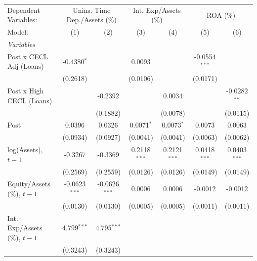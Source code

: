 
\begingroup
\centering
\begin{tabular}{lcccccc}
   \tabularnewline \midrule \midrule
   Dependent Variables: & \multicolumn{2}{c}{Unins. Time Dep./Assets (\%)} & \multicolumn{2}{c}{Int. Exp/Assets (\%)} & \multicolumn{2}{c}{ROA (\%)}\\
   Model:                         & (1)             & (2)             & (3)            & (4)            & (5)             & (6)\\  
   \midrule
   \emph{Variables}\\
   Post x CECL Adj (Loans)        & -0.4380$^{*}$   &                 & 0.0093         &                & -0.0554$^{***}$ &   \\   
                                  & (0.2618)        &                 & (0.0106)       &                & (0.0171)        &   \\   
   Post x High CECL (Loans)       &                 & -0.2392         &                & 0.0034         &                 & -0.0282$^{**}$\\   
                                  &                 & (0.1882)        &                & (0.0078)       &                 & (0.0115)\\   
   Post                           & 0.0396          & 0.0326          & 0.0071$^{*}$   & 0.0073$^{*}$   & 0.0073          & 0.0063\\   
                                  & (0.0934)        & (0.0927)        & (0.0041)       & (0.0041)       & (0.0063)        & (0.0062)\\   
   log(Assets), $t{-}1$           & -0.3267         & -0.3369         & 0.2118$^{***}$ & 0.2121$^{***}$ & 0.0418$^{***}$  & 0.0403$^{***}$\\   
                                  & (0.2569)        & (0.2559)        & (0.0126)       & (0.0126)       & (0.0149)        & (0.0149)\\   
   Equity/Assets (\%), $t{-}1$    & -0.0623$^{***}$ & -0.0626$^{***}$ & 0.0006         & 0.0006         & -0.0012         & -0.0012\\   
                                  & (0.0130)        & (0.0130)        & (0.0005)       & (0.0005)       & (0.0011)        & (0.0011)\\   
   Int. Exp/Assets (\%), $t{-}1$  & 4.799$^{***}$   & 4.795$^{***}$   &                &                &                 &   \\   
                                  & (0.3243)        & (0.3243)        &                &                &                 &   \\   

\end{tabular}

